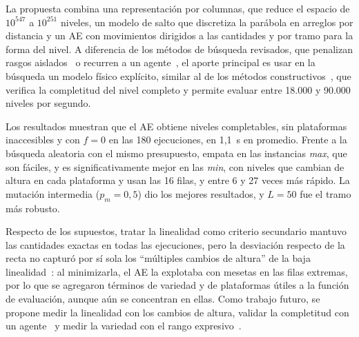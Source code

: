 \documentclass[letter, 10pt]{article}
\begin{document}
La propuesta combina una representaci\'on por columnas, que reduce el espacio de $10^{547}$ a $10^{251}$ niveles, un modelo de salto que discretiza la par\'abola en arreglos por distancia y un AE con movimientos dirigidos a las cantidades y por tramo para la forma del nivel. A diferencia de los m\'etodos de b\'usqueda revisados, que penalizan rasgos aislados~\cite{Dahlskog2013,DePontes2022} o recurren a un agente~\cite{Green2020}, el aporte principal es usar en la b\'usqueda un modelo f\'isico expl\'icito, similar al de los m\'etodos constructivos~\cite{Compton2006,Smith2011}, que verifica la completitud del nivel completo y permite evaluar entre 18.000 y 90.000 niveles por segundo.

Los resultados muestran que el AE obtiene niveles completables, sin plataformas inaccesibles y con $f=0$ en las 180 ejecuciones, en 1,1~s en promedio. Frente a la b\'usqueda aleatoria con el mismo presupuesto, empata en las instancias \emph{max}, que son f\'aciles, y es significativamente mejor en las \emph{min}, con niveles que cambian de altura en cada plataforma y usan las 16 filas, y entre 6 y 27 veces m\'as r\'apido. La mutaci\'on intermedia ($p_m=0{,}5$) dio los mejores resultados, y $L=50$ fue el tramo m\'as robusto.

Respecto de los supuestos, tratar la linealidad como criterio secundario mantuvo las cantidades exactas en todas las ejecuciones, pero la desviaci\'on respecto de la recta no captur\'o por s\'i sola los ``m\'ultiples cambios de altura'' de la baja linealidad~\cite{Saavedra2026}: al minimizarla, el AE la explotaba con mesetas en las filas extremas, por lo que se agregaron t\'erminos de variedad y de plataformas \'utiles a la funci\'on de evaluaci\'on, aunque a\'un se concentran en ellas. Como trabajo futuro, se propone medir la linealidad con los cambios de altura, validar la completitud con un agente~\cite{Green2020} y medir la variedad con el rango expresivo~\cite{Smith2011,Smith2010}.





\end{document}
